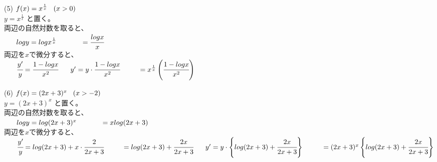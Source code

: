 \documentclass[fleqn]{jsarticle}
\begin{document}
\begin{description}
\begin{multicols}{2}
        \end{multicols}

        \begin{multicols}{2}

            \item[(5)]
                $ f(x) = x^{\frac{1}{x}} \hspace{2ex} (x > 0) $ \\
                $ y = x^{\frac{1}{x}} $ と置く。 \\
                両辺の自然対数を取ると、 \\
                $ \hspace{4ex} log{y} = log{x^{\frac{1}{x}}} \\
                \hspace{8ex} = \cfrac{log{x}}{x} $ \\
                両辺を$x$で微分すると、 \\
                $ \hspace{4ex} \cfrac{y^{\prime}}{y} = \cfrac{1 - log{x}}{x^2} \\
                \hspace{4ex} y^{\prime} = y \cdot \cfrac{1 - log{x}}{x^2} \\
                \hspace{6ex} = x^{\frac{1}{x}} \left(\cfrac{1 - log{x}}{x^2}\right) $ \\
                \vspace{20mm}

            \item[(6)]
                $ f(x) = (2x + 3)^x \hspace{2ex}  (x > -2) $ \\
                $ y = (2x + 3)^x $ と置く。 \\
                両辺の自然対数を取ると、 \\
                $ \hspace{4ex} log{y} = log{(2x + 3)^x} \\
                \hspace{8ex} = xlog{(2x + 3)} $ \\
                両辺を$x$で微分すると、 \\
                $ \hspace{4ex} \cfrac{y^{\prime}}{y} = log{(2x + 3)} + x\cdot\cfrac{2}{2x + 3} \\
                \hspace{6ex} = log{(2x + 3)} + \cfrac{2x}{2x + 3} \\
                \hspace{4ex} y^{\prime} = y \cdot \left\{log{(2x + 3)} + \cfrac{2x}{2x + 3}\right\} \\
                \hspace{6ex} = (2x + 3)^x \left\{log{(2x + 3)} + \cfrac{2x}{2x + 3}\right\} $ \\

        \end{multicols}

    \end{description}
\end{document}
